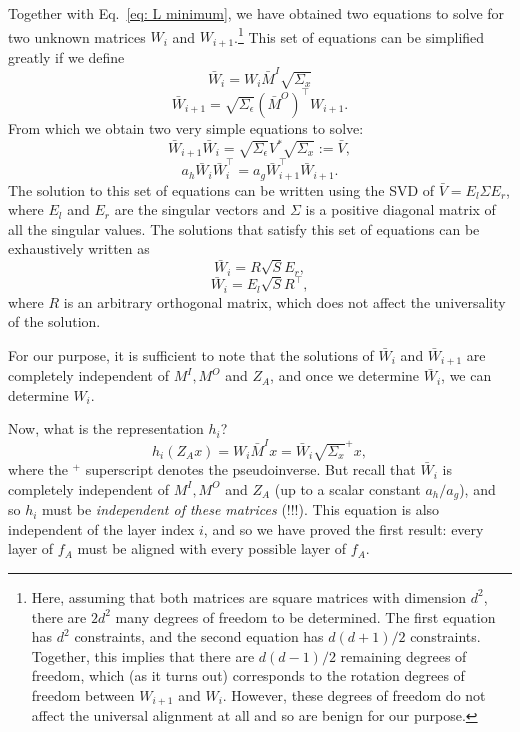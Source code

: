 \documentclass[11pt]{article}
\theoremstyle{plain}
\begin{document}
Together with Eq.~\eqref{eq: L minimum}, we have obtained two equations to solve for two unknown matrices $W_i$ and $W_{i+1}$.\footnote{Here, assuming that both matrices are square matrices with dimension $d^2$, there are $2d^2$ many degrees of freedom to be determined. The first equation has $d^2$ constraints, and the second equation has $d(d+1)/2$ constraints. Together, this implies that there are $d(d-1)/2$ remaining degrees of freedom, which (as it turns out) corresponds to the rotation degrees of freedom between $W_{i+1}$ and $W_i$. However, these degrees of freedom do not affect the universal alignment at all and so are benign for our purpose.} This set of equations can be simplified greatly if we define
\begin{equation}
    \bar{W}_i =  {W}_i \bar{M}^I \sqrt{\Sigma_x}
\end{equation}
\begin{equation}
    \bar{W}_{i+1} = \sqrt{\Sigma_\epsilon} (\bar{M}^O)^\top {W}_{i+1}.
\end{equation}
From which we obtain two very simple equations to solve:
\begin{equation}\label{eq: set of equations 2}
\boxed{
    \bar{W}_{i+1} \bar{W}_i   =  \sqrt{\Sigma_\epsilon} V^* \sqrt{\Sigma_x} := \bar{V},}
\end{equation}
\begin{equation}\label{eq: set of equations 2b}
    \boxed{a_h \bar{W}_i  \bar{W}_i^\top =  a_g \bar{W}_{i+1}^\top \bar{W}_{i+1}.}
\end{equation}
The solution to this set of equations can be written using the SVD of $\bar{V}=E_l \Sigma E_r$, where $E_l$ and $E_r$ are the singular vectors and $\Sigma$ is a positive diagonal matrix of all the singular values. The solutions that satisfy this set of equations can be exhaustively written as
\begin{equation}
    \bar{W}_i =   R \sqrt{S} E_r,
\end{equation}
\begin{equation}
    \bar{W}_i =   E_l \sqrt{S} R^\top,
\end{equation}
where $R$ is an arbitrary orthogonal matrix, which does not affect the universality of the solution.

For our purpose, it is sufficient to note that the solutions of $\bar{W}_i$ and $\bar{W}_{i+1}$ are completely independent of $M^I, M^O$ and $Z_A$, and once we determine $\bar{W}_i$, we can determine $W_i$.

Now, what is the representation $h_i$?
\begin{equation}
    h_i(Z_A x) =   W_i \bar{M}^I x = \bar{W}_i \sqrt{\Sigma_x}^{+}x,
\end{equation}
where the $^+$ superscript denotes the pseudoinverse. 
But recall that $\bar{W}_i$ is completely independent of $M^I, M^O$ and $Z_A$ (up to a scalar constant $a_h/a_g$), and so $h_i$ must be \textit{independent of these matrices} (!!!). This equation is also independent of the layer index $i$, and so we have proved the first result: every layer of $f_A$ must be aligned with every possible layer of $f_A$.
\end{document}
